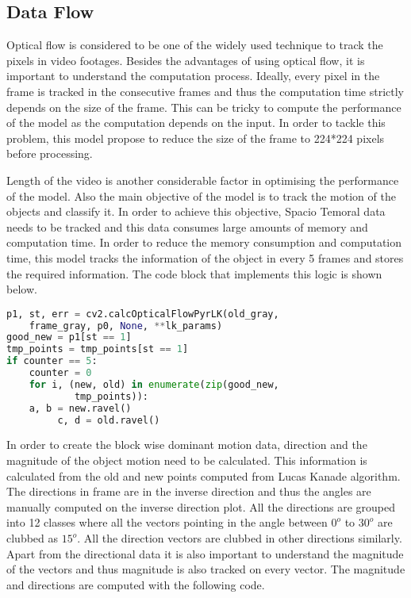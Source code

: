 \subsection{Data Flow}
Optical flow is considered to be one of the widely used technique to track the pixels in video footages. Besides the advantages of using optical flow, it is important to understand the computation process. Ideally, every pixel in the frame is tracked in the consecutive frames and thus the computation time strictly depends on the size of the frame. This can be tricky to compute the performance of the model as the computation depends on the input. In order to tackle this problem, this model propose to reduce the size of the frame to 224*224 pixels before processing.

Length of the video is another considerable factor in optimising the performance of the model. Also the main objective of the model is to track the motion of the objects and classify it. In order to achieve this objective, Spacio Temoral data needs to be tracked and this data consumes large amounts of memory and computation time. In order to reduce the memory consumption and computation time, this model tracks the information of the object in every 5 frames and stores the required information. The code block that implements this logic is shown below.

 \begin{lstlisting}[language=Python, frame=single, caption=Logic to store data in every 5 frames]
p1, st, err = cv2.calcOpticalFlowPyrLK(old_gray, 
	frame_gray, p0, None, **lk_params)
good_new = p1[st == 1]
tmp_points = tmp_points[st == 1]
if counter == 5:
	counter = 0
	for i, (new, old) in enumerate(zip(good_new, 
			tmp_points)):
	a, b = new.ravel()
         c, d = old.ravel()
\end{lstlisting}         

In order to create the block wise dominant motion data, direction and the magnitude of the object motion need to be calculated. This information is calculated from the old and new points computed from Lucas Kanade algorithm. The directions in frame are in the inverse direction and thus the angles are manually computed on the inverse direction plot. All the directions are grouped into 12 classes where all the vectors pointing in the angle between $0^{o}$ to $30^{o}$ are clubbed as $15^{o}$. All the direction vectors are clubbed in other directions similarly. Apart from the directional data it is also important to understand the magnitude of the vectors and thus magnitude is also tracked on every vector. The magnitude and directions are computed with the following code.

